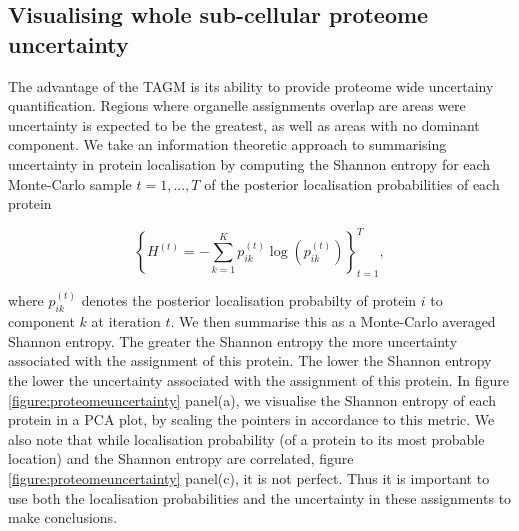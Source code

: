 \documentclass[12pt,english]{article}\usepackage[]{graphicx}\usepackage[]{color}
\begin{document}
\clearpage

\subsection{Visualising whole sub-cellular proteome uncertainty}

The advantage of the TAGM is its ability to provide proteome wide
uncertainy quantification. Regions where organelle assignments overlap
are areas were uncertainty is expected to be the greatest, as well
as areas with no dominant component. We take an information
theoretic approach to summarising uncertainty in protein localisation by computing
the Shannon entropy \citep{shannon:1948} for each Monte-Carlo sample $t = 1,...,T$ of
the posterior localisation probabilities of each protein

\begin{equation}
\left\{H^{(t)} = - \sum_{k=1}^Kp^{(t)}_{ik} \log\left(p^{(t)}_{ik}\right)\right\}^{T}_{t=1},
\end{equation}

where $p^{(t)}_{ik}$ denotes the posterior localisation probabilty of
protein $i$ to component $k$ at iteration $t$. We then summarise this
as a Monte-Carlo averaged Shannon entropy.  The greater the Shannon
entropy the more uncertainty associated with the assignment of this
protein. The lower the Shannon entropy the lower the uncertainty
associated with the assignment of this protein.  In figure
\ref{figure:proteomeuncertainty} panel(a), we visualise the Shannon
entropy of each protein in a PCA plot, by scaling the pointers in
accordance to this metric. We also note that while localisation
probability (of a protein to its most probable location) and the
Shannon entropy are correlated, figure
\ref{figure:proteomeuncertainty} panel(c), it is not perfect. Thus it
is important to use both the localisation probabilities and the
uncertainty in these assignments to make conclusions.
\end{document}
